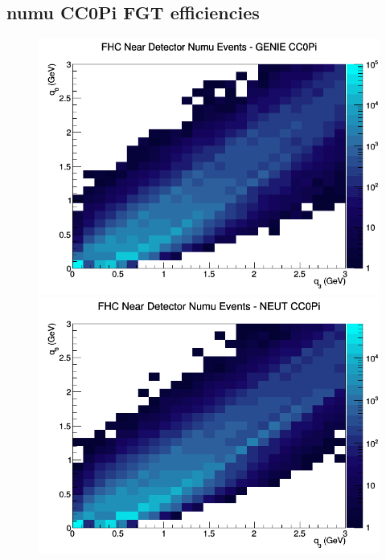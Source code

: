 \subsection{numu CC0Pi FGT efficiencies}
\begin{figure}[h]
\includegraphics[width=\linewidth]{eff_q0_q3/FGT/CC0Pi_FHC_ND_numu_q3_q0_GENIE.png}
\endminipage
{}
\includegraphics[width=\linewidth]{eff_q0_q3/FGT/CC0Pi_FHC_ND_numu_q3_q0_NEUT.png}
\endminipage
{}

\end{figure}
